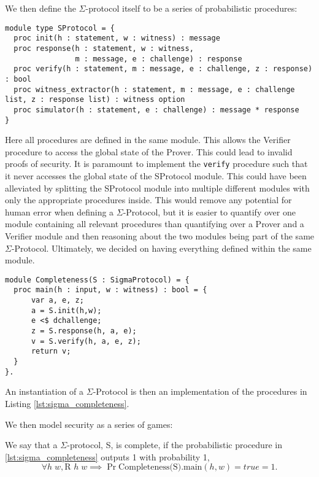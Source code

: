 We then define the $\Sigma$-protocol itself to be a series of probabilistic procedures:
\begin{lstlisting}[label=lst:sigma_procedures,caption= Abstract procedures of $\Sigma$-Protocols]
module type SProtocol = {
  proc init(h : statement, w : witness) : message
  proc response(h : statement, w : witness,
                m : message, e : challenge) : response
  proc verify(h : statement, m : message, e : challenge, z : response) : bool
  proc witness_extractor(h : statement, m : message, e : challenge list, z : response list) : witness option
  proc simulator(h : statement, e : challenge) : message * response
}
\end{lstlisting}

Here all procedures are defined in the same module. This allows the
Verifier procedure to access the global state of the Prover. This could lead to
invalid proofs of security. It is paramount to implement the
\texttt{verify} procedure such that it never accesses the global state of the SProtocol module.
This could have been alleviated by splitting the SProtocol module into multiple
different modules with only the appropriate procedures inside. This would remove
any potential for human error when defining a $\Sigma$-Protocol, but it is
easier to quantify over one module containing all relevant procedures than
quantifying over a Prover and a Verifier module and then reasoning about the two
modules being part of the same $\Sigma$-Protocol.
Ultimately, we decided on having everything defined within the same module.


\begin{lstlisting}[float, label=lst:sigma_completeness,caption=Completeness game for $\Sigma$-Protocols]
module Completeness(S : SigmaProtocol) = {
  proc main(h : input, w : witness) : bool = {
      var a, e, z;
      a = S.init(h,w);
      e <$ dchallenge;
      z = S.response(h, a, e);
      v = S.verify(h, a, e, z);
      return v;
  }
}.
\end{lstlisting}

An instantiation of a $\Sigma$-Protocol is then an implementation of the
procedures in Listing \ref{lst:sigma_completeness}.

We then model security as a series of games:

\begin{definition}[Completeness]
\label{def:sigma:completeness}
  We say that a $\Sigma$-protocol, S, is complete, if the probabilistic procedure in
  \ref{lst:sigma_completeness} outputs 1 with probability 1, \ie
  \begin{equation}
    \label{eq:sigma_completeness}
    \forall h \; w, \text{R } h \; w \implies \Pr{ \text{Completeness(S).main}(h,w) = true } = 1.
  \end{equation}
\end{definition}

